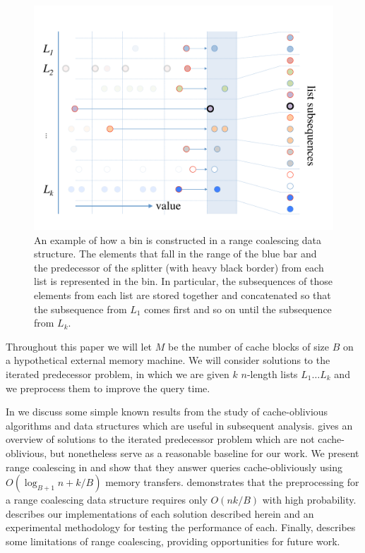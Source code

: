 \begin{figure}[h]
\includegraphics[scale=.33333]{cache-oblivious-fractional-cascading-c.pdf}
\caption{An example of how a bin is constructed in a range coalescing data
structure.  The elements that fall in the range of the blue bar and the predecessor
of the splitter (with heavy black border) from each list is represented in the bin.
In particular, the subsequences of those elements from each list are stored together
and concatenated so that the subsequence from $L_1$ comes first and so on until the
subsequence from $L_k$.}
\label{fig:coalesced_bin} 
\end{figure}

Throughout this paper we will let $M$ be the number of cache blocks of size $B$
on a hypothetical external memory machine.  We will consider solutions to the iterated
predecessor problem, in which we are given $k$ $n$-length lists $L_1 \ldots L_k$ and
we preprocess them to improve the query time.

In  we discuss some simple known results from the study of
cache-oblivious algorithms and data structures which are useful in subsequent analysis.
 gives an overview of solutions to the iterated predecessor problem
which are not cache-oblivious, but nonetheless serve as a reasonable baseline for
our work.  We present range coalescing in  and show that they
answer queries cache-obliviously using $O(\log_{B+1} n + k/B)$ memory transfers.
 demonstrates that the preprocessing for a range coalescing
data structure requires only $O(nk/B)$ with high probability.   
describes our implementations of each solution described herein and an experimental
methodology for testing the performance of each.  Finally,  
describes some limitations of range coalescing, providing opportunities for future
work.


